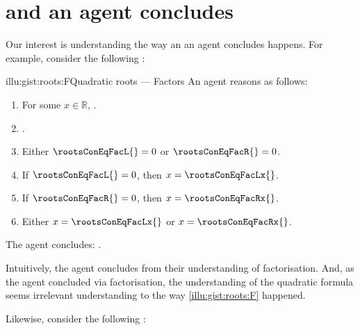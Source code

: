 \chapter{\qWhy{} and \qHow{} an agent concludes}
\label{cha:intro}


\begin{note}
  Our interest is understanding the way an  an agent concludes happens.
  For example, consider the following :

  \begin{rscenario}{illu:gist:roots:F}{Quadratic roots --- Factors}%
    An agent reasons as follows:
    \begin{enumerate}[label=\arabic*., ref=\arabic*]
    \item
      \label{illu:gist:roots:F:eq}
      For some \(x \in \mathbb{R}\), \rootsConEq{}.
    \item
      \label{illu:gist:roots:F:factor}
      \rootsConEqFac{}.
    \item
      \label{illu:gist:roots:F:zero}
      Either \(\rootsConEqFacL{} = 0\) or \(\rootsConEqFacR{} = 0\).
    \item
      \label{illu:gist:roots:F:case:a}
      If \(\rootsConEqFacL{} = 0\), then \(x = \rootsConEqFacLx{}\).
    \item
      \label{illu:gist:roots:F:case:b}
      If \(\rootsConEqFacR{} = 0\), then \(x = \rootsConEqFacRx{}\).
    \item
      \label{illu:gist:roots:F:factor:done}
      Either \(x = \rootsConEqFacLx{}\) or \(x = \rootsConEqFacRx{}\).
    \end{enumerate}
    The agent concludes:
    \rootsCon{}.
  \end{rscenario}

  \noindent%
  Intuitively, the agent concludes \propI{\rootsCon{}} from their understanding of factorisation.
  And, as the agent concluded via factorisation, the \agents{} understanding of the quadratic formula seems irrelevant understanding to the way \autoref{illu:gist:roots:F} happened.

  Likewise, consider the following :


\end{note}
